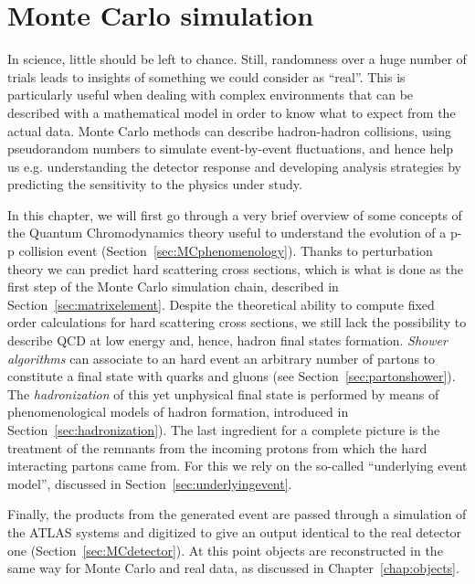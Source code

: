 \clearpage{\pagestyle{empty}\cleardoublepage}

\chapter{Monte Carlo simulation}\label{chap:mc}

In science, little should be left to chance. Still, randomness
over a huge number of trials leads to insights of something we could
consider as ``real''. This is particularly useful when dealing with 
complex environments that can be described with a mathematical model
in order to know what to expect from the actual data.
Monte Carlo methods can describe hadron-hadron collisions,
using pseudorandom numbers to simulate event-by-event fluctuations, and
hence help us e.g. understanding the detector response and developing analysis
strategies by predicting the sensitivity to the physics under study.

In this chapter, we will first go through a very brief overview of some concepts of the 
Quantum Chromodynamics theory useful to understand the evolution of a p-p collision
event (Section~\ref{sec:MCphenomenology}). Thanks to perturbation theory we can predict hard 
scattering cross sections, which is what is done as the first step of the Monte Carlo 
simulation chain, described in Section~\ref{sec:matrixelement}.
Despite the theoretical ability to compute fixed order calculations for hard scattering cross sections,
we still lack the possibility to describe QCD at low energy and, hence, hadron final states formation. 
{\it Shower algorithms} can associate to an hard event an arbitrary number of partons to constitute
a final state with quarks and gluons (see Section~\ref{sec:partonshower}). 
The {\it hadronization} of this yet unphysical final state is
performed by means of phenomenological models of hadron formation, introduced in Section~\ref{sec:hadronization}). 
The last ingredient for a complete picture is the treatment of
the remnants from the incoming protons from which the hard interacting partons
came from. For this we rely on the so-called ``underlying event model'', discussed in 
Section~\ref{sec:underlyingevent}.

Finally, the products from the generated event are passed through a simulation of the ATLAS
systems and digitized to give an output identical to the real detector one (Section~\ref{sec:MCdetector}).
At this point objects are reconstructed in the same way for Monte Carlo
and real data, as discussed in Chapter~\ref{chap:objects}.
 

